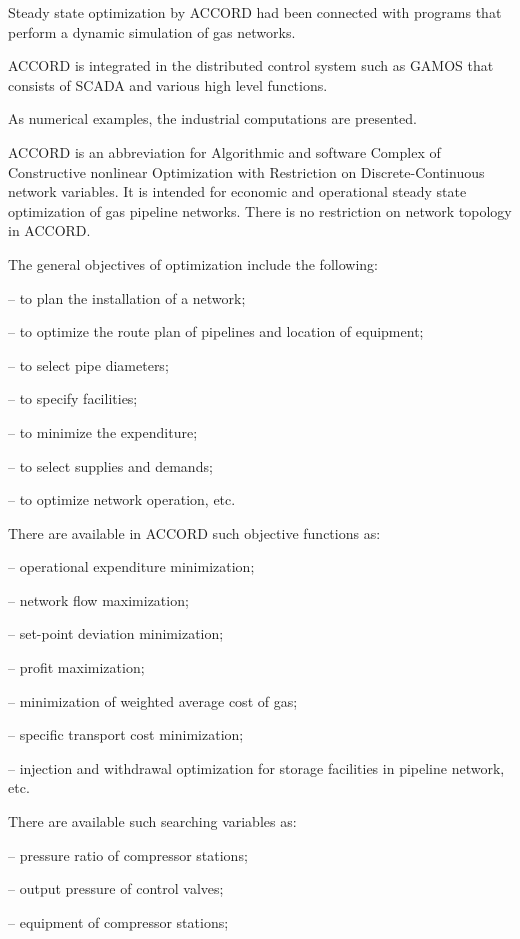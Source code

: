 \documentclass{article}
\begin{document}
Steady state optimization by ACCORD had been connected with programs that
perform a dynamic simulation of gas networks.

ACCORD is integrated in the distributed control system such as GAMOS that
consists of SCADA and various high level functions.

As numerical examples, the industrial computations are presented.

\bigskip

ACCORD is an abbreviation for Algorithmic and software Complex of
Constructive nonlinear Optimization with Restriction on Discrete-Continuous
network variables. It is intended for economic and operational steady state
optimization of gas pipeline networks. There is no restriction on network
topology in ACCORD.

The general objectives of optimization include the following:

\qquad -- to plan the installation of a network;

\qquad -- to optimize the route plan of pipelines and location of equipment;

\qquad -- to select pipe diameters;

\qquad -- to specify facilities;

\qquad -- to minimize the expenditure;

\qquad -- to select supplies and demands;

\qquad -- to optimize network operation, etc.

There are available in ACCORD such objective functions as:

\qquad -- operational expenditure minimization;

\qquad -- network flow maximization;

\qquad -- set-point deviation minimization;

\qquad -- profit maximization;

\qquad -- minimization of weighted average cost of gas;

\qquad -- specific transport cost minimization;

\qquad -- injection and withdrawal optimization for storage facilities in
pipeline network, etc.

There are available such searching variables as:

\qquad -- pressure ratio of compressor stations;

\qquad -- output pressure of control valves;

\qquad -- equipment of compressor stations;
\end{document}
